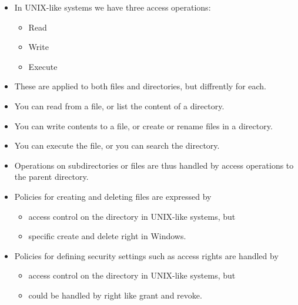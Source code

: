 \documentclass{beamer}
\begin{document}
\begin{frame}{\insertsubsectionhead}
  \begin{itemize}
    \item In UNIX-like systems we have three access operations:
      \begin{itemize}
        \item Read
        \item Write
        \item Execute
      \end{itemize}

    \item These are applied to both files and directories, but diffrently for 
      each.

    \item You can read from a file, or list the content of a directory.

    \item You can write contents to a file, or create or rename files in 
      a directory.

    \item You can execute the file, or you can search the directory.

    \item Operations on subdirectories or files are thus handled by access 
      operations to the parent directory.

  \end{itemize}
\end{frame}

\begin{frame}{\insertsubsectionhead}
  \begin{itemize}
    \item Policies for creating and deleting files are expressed by
      \begin{itemize}
        \item access control on the directory in UNIX-like systems, but
        \item specific create and delete right in Windows.
      \end{itemize}

    \item Policies for defining security settings such as access rights are 
      handled by
      \begin{itemize}
        \item access control on the directory in UNIX-like systems, but
        \item could be handled by right like grant and revoke.
      \end{itemize}
  \end{itemize}
\end{frame}
\end{document}
